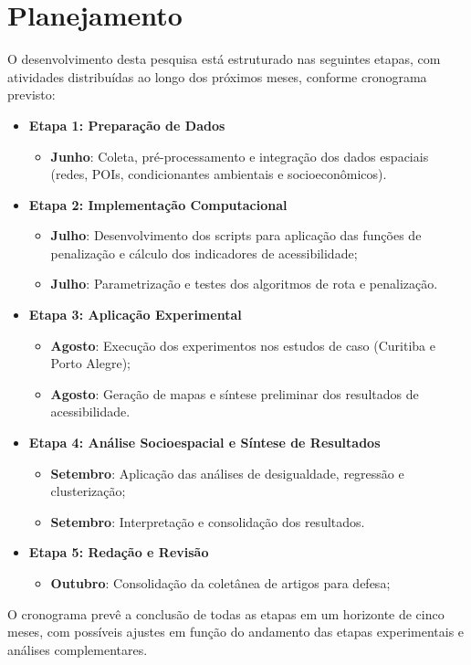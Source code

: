 \section{Planejamento}

O desenvolvimento desta pesquisa está estruturado nas seguintes etapas, com atividades distribuídas ao longo dos próximos meses, conforme cronograma previsto:

\begin{itemize}
    \item \textbf{Etapa 1: Preparação de Dados}
    \begin{itemize}
        \item \textbf{Junho}: Coleta, pré-processamento e integração dos dados espaciais (redes, POIs, condicionantes ambientais e socioeconômicos).
    \end{itemize}
    
    \item \textbf{Etapa 2: Implementação Computacional}
    \begin{itemize}
        \item \textbf{Julho}: Desenvolvimento dos scripts para aplicação das funções de penalização e cálculo dos indicadores de acessibilidade;
        \item \textbf{Julho}: Parametrização e testes dos algoritmos de rota e penalização.
    \end{itemize}
    
    \item \textbf{Etapa 3: Aplicação Experimental}
    \begin{itemize}
        \item \textbf{Agosto}: Execução dos experimentos nos estudos de caso (Curitiba e Porto Alegre);
        \item \textbf{Agosto}: Geração de mapas e síntese preliminar dos resultados de acessibilidade.
    \end{itemize}

    \item \textbf{Etapa 4: Análise Socioespacial e Síntese de Resultados}
    \begin{itemize}
        \item \textbf{Setembro}: Aplicação das análises de desigualdade, regressão e clusterização;
        \item \textbf{Setembro}: Interpretação e consolidação dos resultados.
    \end{itemize}
    
    \item \textbf{Etapa 5: Redação e Revisão}
    \begin{itemize}
        \item \textbf{Outubro}: Consolidação da coletânea de artigos para defesa;
    \end{itemize}
\end{itemize}

O cronograma prevê a conclusão de todas as etapas em um horizonte de cinco meses, com possíveis ajustes em função do andamento das etapas experimentais e análises complementares.